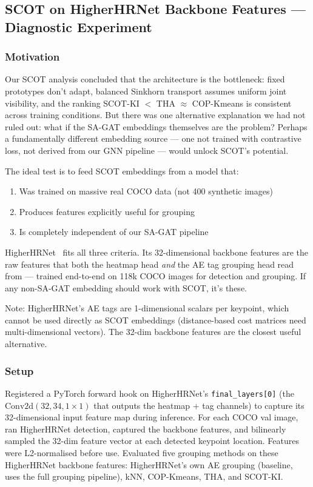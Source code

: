 \subsection{SCOT on HigherHRNet Backbone Features --- Diagnostic Experiment}

\subsubsection{Motivation}

Our SCOT analysis concluded that the architecture is the bottleneck: fixed prototypes don't adapt, balanced Sinkhorn transport assumes uniform joint visibility, and the ranking SCOT-KI $<$ THA $\approx$ COP-Kmeans is consistent across training conditions. But there was one alternative explanation we had not ruled out: what if the SA-GAT embeddings themselves are the problem? Perhaps a fundamentally different embedding source --- one not trained with contrastive loss, not derived from our GNN pipeline --- would unlock SCOT's potential.

The ideal test is to feed SCOT embeddings from a model that:
\begin{enumerate}
    \item Was trained on massive real COCO data (not 400 synthetic images)
    \item Produces features explicitly useful for grouping
    \item Is completely independent of our SA-GAT pipeline
\end{enumerate}

HigherHRNet~\cite{cheng2020higherhrnet} fits all three criteria. Its 32-dimensional backbone features are the raw features that both the heatmap head \emph{and} the AE tag grouping head read from --- trained end-to-end on 118k COCO images for detection and grouping. If any non-SA-GAT embedding should work with SCOT, it's these.

Note: HigherHRNet's AE tags are 1-dimensional scalars per keypoint, which cannot be used directly as SCOT embeddings (distance-based cost matrices need multi-dimensional vectors). The 32-dim backbone features are the closest useful alternative.

\subsubsection{Setup}

Registered a PyTorch forward hook on HigherHRNet's \texttt{final\_layers[0]} (the $\text{Conv2d}(32, 34, 1{\times}1)$ that outputs the heatmap + tag channels) to capture its 32-dimensional input feature map during inference. For each COCO val image, ran HigherHRNet detection, captured the backbone features, and bilinearly sampled the 32-dim feature vector at each detected keypoint location. Features were L2-normalised before use. Evaluated five grouping methods on these HigherHRNet backbone features: HigherHRNet's own AE grouping (baseline, uses the full grouping pipeline), kNN, COP-Kmeans, THA, and SCOT-KI.


